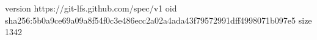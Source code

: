 version https://git-lfs.github.com/spec/v1
oid sha256:5b0a9ce69a09a8f54f0c3e486ecc2a02a4ada43f79572991dff4998071b097e5
size 1342
